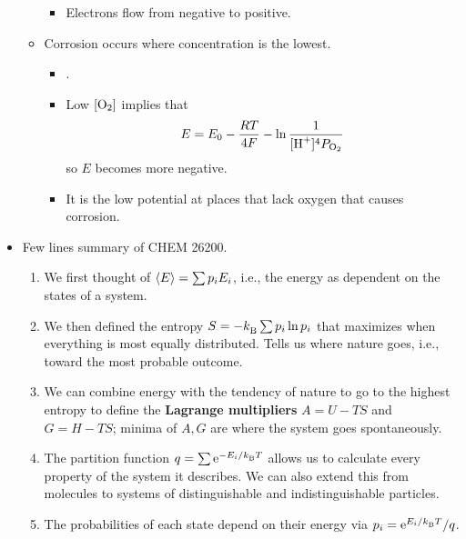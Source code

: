 \documentclass[../notes.tex]{subfiles}
\begin{document}
\begin{itemize}
\begin{itemize}
        \begin{itemize}
            \item Electrons flow from negative to positive.
        \end{itemize}
        \item Corrosion occurs where  concentration is the lowest.
        \begin{itemize}
            \item {}.
            \item Low $[\ce{O2}]$ implies that
            \begin{equation*}
                E = E_0-\frac{RT}{4F}-\ln\frac{1}{[\ce{H+}]^4P_{\ce{O2}}}
            \end{equation*}
            so $E$ becomes more negative.
            \item It is the low potential at places that lack oxygen that causes corrosion.
        \end{itemize}
    \end{itemize}
    \item Few lines summary of CHEM 26200.
    \begin{enumerate}
        \item We first thought of $\prb{E}=\sum p_iE_i$, i.e., the energy as dependent on the states of a system.
        \item We then defined the entropy $S=-\kB\sum p_i\ln p_i$ that maximizes when everything is most equally distributed. Tells us where nature goes, i.e., toward the most probable outcome.
        \item We can combine energy with the tendency of nature to go to the highest entropy to define the \textbf{Lagrange multipliers} $A=U-TS$ and $G=H-TS$; minima of $A,G$ are where the system goes spontaneously.
        \item The partition function $q=\sum\e[-E_i/\kB T]$ allows us to calculate every property of the system it describes. We can also extend this from molecules to systems of distinguishable and indistinguishable particles.
        \item The probabilities of each state depend on their energy via $p_i=\e[E_i/\kB T]/q$.
    \end{enumerate}
\end{itemize}
\end{document}
